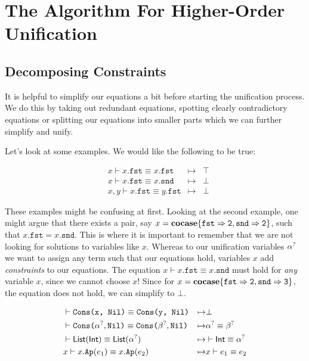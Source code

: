 \documentclass[twoside,12pt,a4paper]{article}
\begin{document}
\section{The Algorithm For Higher-Order Unification}

\subsection{Decomposing Constraints}

It is helpful to simplify our equations a bit before starting the unification process.
We do this by taking out redundant equations, spotting clearly contradictory equations or splitting our equations into smaller parts which we can further simplify and unify.

Let's look at some examples. We would like the following to be true:
\begin{example}
    \begin{align*}
    &x \vdash x.\mathtt{fst} \equiv x.\mathtt{fst} &\mapsto& \top
    \\
    &x \vdash x.\mathtt{fst} \equiv x.\mathtt{snd} &\mapsto& \bot 
    \\
    &x,y \vdash x.\mathtt{fst} \equiv y.\mathtt{fst} &\mapsto& \bot 
    \end{align*}
\end{example}
These examples might be confusing at first. Looking at the second example, one might argue that there exists a pair, say $x = \textbf{cocase}\{\mathtt{fst\Rightarrow 2, snd\Rightarrow 2}\}$, such that
$x.\mathtt{fst} = x.\mathtt{snd}$. This is where it is important to remember that we are not looking for solutions to variables like $x$.
Whereas to our unification variables $\alpha^?$ we want to assign any term such that our equations hold, variables $x$ add \textit{constraints} to our equations. 
The equation $x \vdash x.\mathtt{fst} \equiv x.\mathtt{snd}$ must hold for \textit{any} variable $x$, since we cannot choose $x$! 
Since for $x = \textbf{cocase}\{\mathtt{fst\Rightarrow 2, snd\Rightarrow 3}\}$, the equation does not hold, we can simplify to $\bot$.

\begin{example}
    \begin{align*}
    &\vdash \texttt{Cons(x, Nil)} \equiv \texttt{Cons(y, Nil)}&\mapsto& \bot
    \\
    &\vdash \texttt{Cons(}\alpha^?, \texttt{Nil)}\equiv\texttt{Cons(}\beta^?, \texttt{Nil)}
    &\mapsto&\alpha^?\equiv \beta^?
    \\
    &\vdash \mathsf{List(Int)}\equiv \mathsf{List(\alpha^?)}
    &\mapsto& \vdash \mathsf{Int}\equiv \alpha^?
    \\
    &x \vdash x.\texttt{Ap}(e_1)\equiv x.\texttt{Ap}(e_2) &\mapsto& x\vdash e_1\equiv e_2 
    \end{align*}
\end{example}
\end{document}
